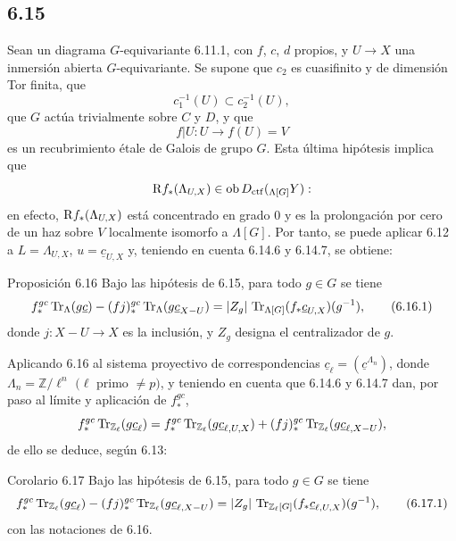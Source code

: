 \subsection*{6.15}
Sean un diagrama $G$-equivariante 6.11.1, con $f$, $c$, $d$ propios, y $U\to X$ una inmersión abierta $G$-equivariante. Se supone que $c_2$ es cuasifinito y de dimensión Tor finita, que
\[
c_1^{-1}(U)\subset c_2^{-1}(U),
\]
que $G$ actúa trivialmente sobre $C$ y $D$, y que
\[
f|U:U\longrightarrow f(U)=V
\]
es un recubrimiento étale de Galois de grupo $G$. Esta última hipótesis implica que
\[
\mathrm{R} f_*(\Lambda_{U,X})\in\operatorname{ob} D_{\mathrm{ctf}}({}_{\Lambda[G]}Y):
\]
en efecto, $\mathrm{R} f_*(\Lambda_{U,X})$ está concentrado en grado $0$ y es la prolongación por cero de un haz sobre $V$ localmente isomorfo a $\Lambda[G]$. Por tanto, se puede aplicar 6.12 a $L=\Lambda_{U,X}$, $u=\underline c_{U,X}$ y, teniendo en cuenta 6.14.6 y 6.14.7, se obtiene:

\begin{statement}{Proposición 6.16}
Bajo las hipótesis de 6.15, para todo $g\in G$ se tiene
\begin{equation}
f_*^{gc}\operatorname{Tr}_{\Lambda}(g\underline c)
-(fj)_*^{gc}\operatorname{Tr}_{\Lambda}(g\underline c_{X-U})
=
|Z_g|\,\operatorname{Tr}_{\Lambda[G]}(f_*\underline c_{U,X})(g^{-1}),
\tag{6.16.1}
\end{equation}
donde $j:X-U\to X$ es la inclusión, y $Z_g$ designa el centralizador de $g$.
\end{statement}

Aplicando 6.16 al sistema proyectivo de correspondencias $\underline c_{\ell}=(\underline c^{\Lambda_n})$, donde $\Lambda_n=\mathbb Z/\ell^n$ $(\ell$ primo $\ne p)$, y teniendo en cuenta que 6.14.6 y 6.14.7 dan, por paso al límite y aplicación de $f_*^{gc}$,
\[
f_*^{gc}\operatorname{Tr}_{\mathbb Z_{\ell}}(g\underline c_{\ell})
=
f_*^{gc}\operatorname{Tr}_{\mathbb Z_{\ell}}(g\underline c_{\ell,U,X})
+(fj)_*^{gc}\operatorname{Tr}_{\mathbb Z_{\ell}}(g\underline c_{\ell,X-U}),
\]
de ello se deduce, según 6.13:

\begin{statement}{Corolario 6.17}
Bajo las hipótesis de 6.15, para todo $g\in G$ se tiene
\begin{equation}
f_*^{gc}\operatorname{Tr}_{\mathbb Z_{\ell}}(g\underline c_{\ell})
-(fj)_*^{gc}\operatorname{Tr}_{\mathbb Z_{\ell}}(g\underline c_{\ell,X-U})
=
|Z_g|\,\operatorname{Tr}_{\mathbb Z_{\ell}[G]}(f_*\underline c_{\ell,U,X})(g^{-1}),
\tag{6.17.1}
\end{equation}
con las notaciones de 6.16.
\end{statement}

